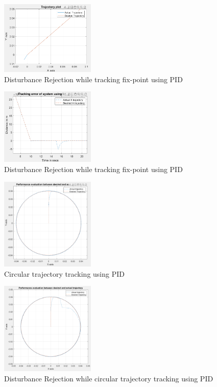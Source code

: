 \documentclass[conference]{IEEEtran}
\begin{document}
\begin{figure}[htbp]
\centerline{\includegraphics[width=0.4\textwidth]{DRFPTPID.png}}
\caption{Disturbance Rejection while tracking fix-point using PID}
\label{fig8}
\end{figure}
\begin{figure}[htbp]
\centerline{\includegraphics[width=0.4\textwidth]{DRFPTEPID.png}}
\caption{Disturbance Rejection while tracking fix-point using PID}
\label{fig9}
\end{figure}
\begin{figure}[htbp]
\centerline{\includegraphics[width=0.4\textwidth]{CTPID.png}}
\caption{Circular trajectory tracking using PID}
\label{fig10}
\end{figure}
\begin{figure}[htbp]
\centerline{\includegraphics[width=0.4\textwidth]{DRCTPID.png}}
\caption{Disturbance Rejection while circular trajectory tracking using PID}
\label{fig11}
\end{figure}
\end{document}
